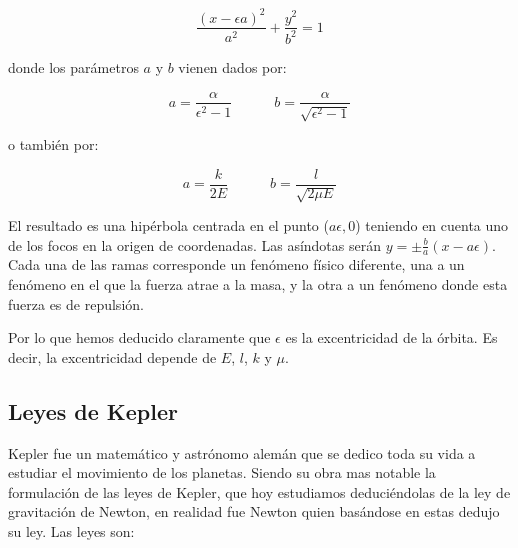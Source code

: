 \documentclass[12pt,a4paper]{book}
\begin{document}
\begin{itemize}
\begin{equation}
\dfrac{(x-\epsilon a)^2}{a^2} + \frac{y^2}{b^2} = 1
\end{equation}

donde los parámetros $a$ y $b$ vienen dados por:


\begin{equation}
a = \dfrac{\alpha}{\epsilon^2-1} \quad \quad \quad b = \dfrac{\alpha}{\sqrt{\epsilon^2-1}}
\end{equation}

o también por:

\begin{equation}
a = \dfrac{k}{2E} \quad \quad \quad b = \dfrac{l}{\sqrt{2 \mu E}}
\end{equation}

El resultado es una hipérbola centrada en el punto ($a \epsilon,0$) teniendo en cuenta uno de los focos en la origen de coordenadas. Las asíndotas serán $y=\pm \frac{b}{a}(x-a \epsilon)$. Cada una de las ramas corresponde un fenómeno físico diferente, una a un fenómeno en el que la fuerza atrae a la masa, y la otra a un fenómeno donde esta fuerza es de repulsión.

\end{itemize}

Por lo que hemos deducido claramente que $\epsilon$ es la excentricidad de la órbita. Es decir, la excentricidad depende de $E$, $l$, $k$ y $\mu$. 


\subsection{Leyes de Kepler}

Kepler fue un matemático y astrónomo alemán que se dedico toda su vida a estudiar el movimiento de los planetas. Siendo su obra mas notable la formulación de las leyes de Kepler, que hoy estudiamos deduciéndolas de la ley de gravitación de Newton, en realidad fue Newton quien basándose en estas dedujo su ley. Las leyes son:
\end{document}
